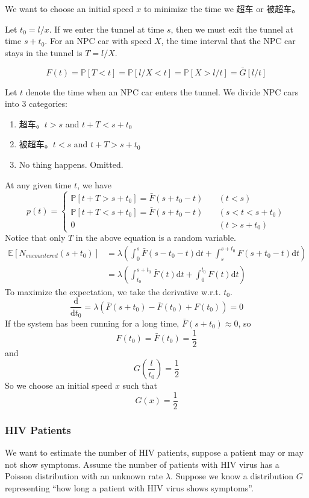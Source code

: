         We want to choose an initial speed $x$ to minimize the time we 超车 or 被超车。

        Let $t_0 = l/x$. If we enter the tunnel at time $s$, then we must exit the tunnel at time $s + t_0$. For an NPC car with speed $X$, the time interval that the NPC car stays in the tunnel is $T=l/X$.

        \[ F(t) = \mathbb{P}[T < t] = \mathbb{P}[l/X < t] = \mathbb{P}[X > l/t] = \bar{G}[l/t] \]

        Let $t$ denote the time when an NPC car enters the tunnel. We divide NPC cars into $3$ categories:
        \begin{enumerate}
            \item 超车。$t > s$ and $t + T < s + t_0$
            \item 被超车。$t < s$ and $t + T > s + t_0$
            \item No thing happens. Omitted.
        \end{enumerate}
        At any given time $t$, we have
        \[
            p(t) =
            \begin{cases}
                \mathbb{P}[t + T > s + t_0] = \bar{F}(s+t_0-t) \quad &(t < s)\\
                \mathbb{P}[t + T < s + t_0] = \bar{F}(s+t_0-t) \quad &(s < t < s+t_0)\\
                0 \quad &(t > s + t_0)
            \end{cases}
        \]
        Notice that only $T$ in the above equation is a random variable.
        \begin{align*}
            \mathbb{E}[N_{encountered}(s+t_0)] &= \lambda \left( \int_0^s \bar{F}(s-t_0-t)\mathrm{d}t + \int_s^{s+t_0} F(s+t_0-t)\mathrm{d}t \right)\\
            &= \lambda \left( \int_{t_0}^{s+t_0} \bar{F}(t)\mathrm{d}t + \int_0^{t_0} F(t)\mathrm{d}t \right)
        \end{align*}
        To maximize the expectation, we take the derivative w.r.t. $t_0$.
        \[ \frac{\mathrm{d}}{\mathrm{d}t_0} = \lambda \left( \bar{F}(s+t_0) - \bar{F}(t_0) + F(t_0) \right) = 0 \]
        If the system has been running for a long time, $\bar{F}(s+t_0) \approx 0$, so
        \[ F(t_0) = \bar{F}(t_0) = \frac{1}{2} \]
        and
        \[ G\left(\frac{l}{t_0}\right) = \frac{1}{2} \]
        So we choose an initial speed $x$ such that
        \[ G(x) = \frac{1}{2} \]

        \subsubsection{HIV Patients}
        We want to estimate the number of HIV patients, suppose a patient may or may not show symptoms. Assume the number of patients with HIV virus has a Poisson distribution with an unknown rate $\lambda$. Suppose we know a distribution $G$ representing ``how long a patient with HIV virus shows symptoms''.

